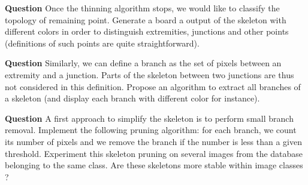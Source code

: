 \documentclass[a4paper, 11pt]{article}
\begin{document}
{\bf Question} Once the thinning algorithm stops, we would like to classify the topology of remaining point. Generate a board a output of the skeleton with different  colors in order to distinguish extremities, junctions and other points (definitions of such points are quite straightforward). 


{\bf Question} Similarly, we can define a branch as the set of pixels between an extremity and a junction. Parts of the skeleton between two junctions are thus not considered in this definition. Propose an algorithm to extract all branches of a skeleton (and display each branch with different color for instance).


{\bf Question} A first approach to simplify the skeleton is to perform small branch removal. Implement the following pruning algorithm: for each branch, we count its number of pixels and we remove the branch if the number is less than a given threshold. Experiment this skeleton pruning on several images from the database belonging to the same class. Are these skeletons more stable within image classes ?
\end{document}
